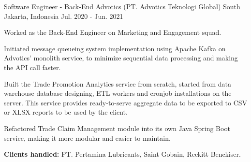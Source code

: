 \begin{cventries}
  \cventry
    {Software Engineer - Back-End} %
    {Advotics (PT. Advotics Teknologi Global)} %
    {South Jakarta, Indonesia} %
    {Jul. 2020 - Jun. 2021} %
    {
      \begin{cvitems}
        \item {Worked as the Back-End Engineer on Marketing and Engagement squad.}
        \item {Initiated message queueing system implementation using Apache Kafka on Advotics' monolith service, to minimize sequential data processing and making the API call faster.}
        \item {Built the Trade Promotion Analytics service from scratch, started from data warehouse database designing, ETL workers and cronjob installations on the server. This service provides ready-to-serve aggregate data to be exported to CSV or XLSX reports to be used by the client.}
        \item {Refactored Trade Claim Management module into its own Java Spring Boot service, making it more modular and easier to maintain.}
        \item {\textbf{Clients handled:} PT. Pertamina Lubricants, Saint-Gobain, Reckitt-Benckiser.}
      \end{cvitems}
    }

\end{cventries}
